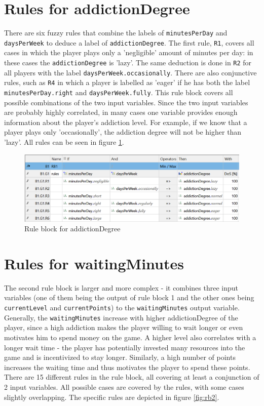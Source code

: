 \section{Rules for addictionDegree}
\label{sec:rb1}

There are six fuzzy rules that combine the labels of \texttt{minutesPerDay} and \texttt{daysPerWeek} to deduce a label of \texttt{addictionDegree}. The first rule, \texttt{R1}, covers all cases in which the player plays only a 'negligible' amount of minutes per day: in these cases the \texttt{addictionDegree} is 'lazy'. The same deduction is done in \texttt{R2} for all players with the label \texttt{daysPerWeek.occasionally}. There are also conjunctive rules, such as \texttt{R4} in which a player is labelled as 'eager' if he has both the label \texttt{minutesPerDay.right} and \texttt{daysPerWeek.fully}. This rule block covers all possible combinations of the two input variables. Since the two input variables are probably highly correlated, in many cases one variable provides enough information about the player's addiction level. For example, if we know that a player plays only 'occasionally', the addiction degree will not be higher than 'lazy'. All rules can be seen in figure \ref{fig:rb1}.

\begin{figure}[H]
\centering
\includegraphics[width=\textwidth]{img/rb1}
\caption{Rule block for addictionDegree}
\label{fig:rb1} 
\end{figure}

\section{Rules for waitingMinutes}
\label{sec:rb2}

The second rule block is larger and more complex - it combines three input variables (one of them being the output of rule block 1 and the other ones being \texttt{currentLevel} and \texttt{currentPoints}) to the \texttt{waitingMinutes} output variable. Generally, the \texttt{waitingMinutes} increase with higher addictionDegree of the player, since a high addiction makes the player willing to wait longer or even motivates him to spend money on the game. A higher level also correlates with a longer wait time - the player has potentially invested many resources into the game and is incentivized to stay longer. Similarly, a high number of points increases the waiting time and thus motivates the player to spend these points. There are 15 different rules in the rule block, all covering at least a conjunction of 2 input variables. All possible cases are covered by the rules, with some cases slightly overlapping. The specific rules are depicted in figure \ref{fig:rb2}.

